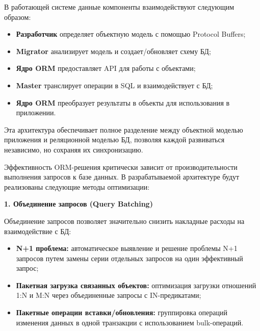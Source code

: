     
        В работающей системе данные компоненты взаимодействуют следующим образом:
        
        \begin{itemize}
            \item \textbf{Разработчик} определяет объектную модель с помощью Protocol Buffers;
            
            \item \textbf{Migrator} анализирует модель и создает/обновляет схему БД;
            
            \item \textbf{Ядро ORM} предоставляет API для работы с объектами;
            
            \item \textbf{Master} транслирует операции в SQL и взаимодействует с БД;
            
            \item \textbf{Ядро ORM} преобразует результаты в объекты для использования в приложении.
        \end{itemize}
        
        Эта архитектура обеспечивает полное разделение между объектной моделью приложения и реляционной моделью БД, позволяя каждой развиваться независимо, но сохраняя их синхронизацию.

    
        Эффективность ORM-решения критически зависит от производительности выполнения запросов к базе данных. В разрабатываемой архитектуре будут реализованы следующие методы оптимизации:
        
        \textbf{1. Объединение запросов (Query Batching)}
        
            Объединение запросов позволяет значительно снизить накладные расходы на взаимодействие с БД:
            
            \begin{itemize}
                \item \textbf{N+1 проблема:} автоматическое выявление и решение проблемы N+1 запросов путем замены серии отдельных запросов на один эффективный запрос;
                
                \item \textbf{Пакетная загрузка связанных объектов:} оптимизация загрузки отношений 1:N и M:N через объединенные запросы с IN-предикатами;
                
                \item \textbf{Пакетные операции вставки/обновления:} группировка операций изменения данных в одной транзакции с использованием bulk-операций.
            \end{itemize}
            
